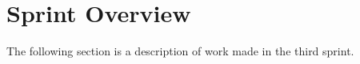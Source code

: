 \section{Sprint Overview}

The following section is a description of work made in the third sprint.



